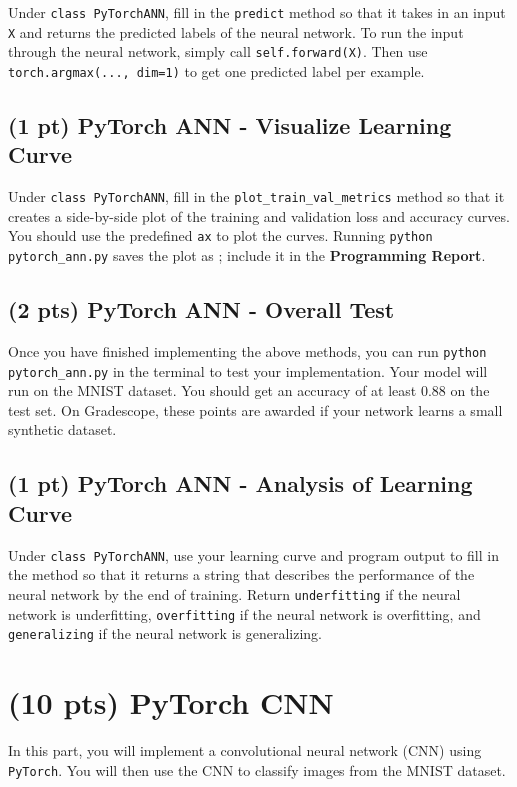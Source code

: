 \documentclass[11pt]{exam}
\begin{document}
Under \verb|class PyTorchANN|, fill in the \verb|predict| method so that it takes in an input \verb|X| and returns the predicted labels of the neural network. To run the input through the neural network, simply call \verb|self.forward(X)|. Then use \verb|torch.argmax(..., dim=1)| to get one predicted label per example.

\subsection{(1 pt) PyTorch ANN - Visualize Learning Curve}

Under \verb|class PyTorchANN|, fill in the \verb|plot_train_val_metrics| method so that it creates a side-by-side plot of the training and validation loss and accuracy curves. You should use the predefined \verb|ax| to plot the curves. Running \verb|python pytorch_ann.py| saves the plot as ; include it in the \textbf{Programming Report}.

\subsection{(2 pts) PyTorch ANN - Overall Test}

Once you have finished implementing the above methods, you can run \verb|python pytorch_ann.py| in the terminal to test your implementation. Your model will run on the MNIST dataset. You should get an accuracy of at least 0.88 on the test set. On Gradescope, these points are awarded if your network learns a small synthetic dataset.

\subsection{(1 pt) PyTorch ANN - Analysis of Learning Curve}

Under \verb|class PyTorchANN|, use your learning curve and program output to fill in the  method so that it returns a string that describes the performance of the neural network by the end of training. Return \verb|underfitting| if the neural network is underfitting, \verb|overfitting| if the neural network is overfitting, and \verb|generalizing| if the neural network is generalizing.

\section{(10 pts) PyTorch CNN}
In this part, you will implement a convolutional neural network (CNN) using \verb|PyTorch|. You will then use the CNN to classify images from the MNIST dataset.
\end{document}
